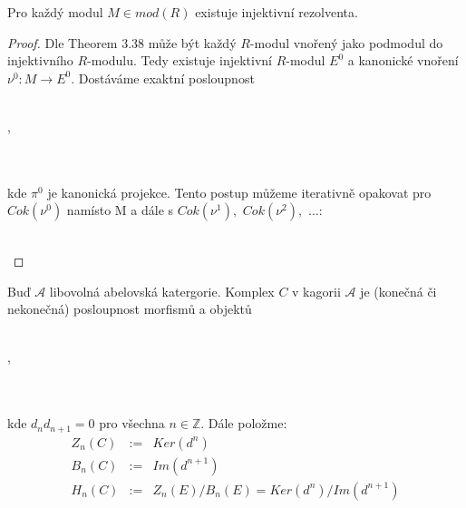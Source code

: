      \begin{lem}
       Pro každý modul $M\in mod(R)$ existuje injektivní rezolventa.
     \end{lem}
     \begin{proof}
       Dle \cite{5} Theorem 3.38 může být každý $R$-modul vnořený jako 
       podmodul do injektivního $R$-modulu. Tedy existuje injektivní $R$-modul $E^0$ a 
       kanonické vnoření $\nu^0:M\rightarrow E^0$. Dostáváme exaktní posloupnost\\\\
       \centerline{,}\\\\
      kde $\pi^0$ je kanonická projekce. Tento postup můžeme iterativně opakovat 
      pro $Cok(\nu^0)$ namísto M a dále s 
      $Cok(\nu^1),$ $Cok(\nu^2),$ $\ldots$:\\\\
       \centerline{}     
    \end{proof}     
    
    \begin{dfn}
      Buď $\mathcal A$ libovolná abelovská katergorie. Komplex $C$ v kagorii $\mathcal A$ je 
      (konečná či nekonečná) posloupnost morfismů a objektů\\\\
       \centerline{,}\\\\
      kde $d_nd_{n+1}=0$ pro všechna $n\in\mathbb Z$. Dále položme:
      \begin{eqnarray}
        Z_n(C) &:=& Ker(d^n) \nonumber \\
        B_n(C) &:=& Im(d^{n+1}) \nonumber\\
        H_n(C) &:=& Z_n(E)/B_n(E) = Ker(d^n)/Im(d^{n+1}) \nonumber
      \end{eqnarray} 
     \end{dfn}
     

